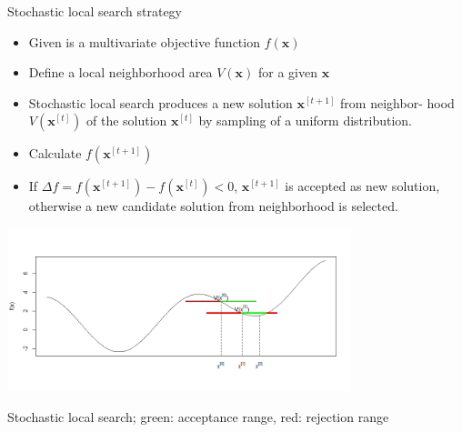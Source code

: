\documentclass[11pt,compress,t,notes=noshow, xcolor=table]{beamer}
\begin{document}
\begin{vbframe}{Stochastic local search strategy}
\vspace{-0.2cm}
\begin{small}
\begin{itemize}
\item Given is a multivariate objective function $f(\bm{x})$
\item Define a local neighborhood area $V(\bm{x})$ for a given $\bm{x}$
\item Stochastic local search produces a new solution $\bm{x}^{[t+1]}$ from neighbor- hood $V(\bm{x}^{[t]})$ of the solution $\bm{x}^{[t]}$ by sampling of a uniform distribution. 
\item Calculate $f(\bm{x}^{[t+1]})$
\item If $\Delta f = f(\bm{x}^{[t+1]}) - f(\bm{x}^{[t]}) < 0$, $\bm{x}^{[t+1]}$ is accepted as new solution, otherwise a new candidate solution from neighborhood is selected.
\end{itemize}
\end{small}
\vspace{-0.5cm}
\begin{center}
\includegraphics[width=0.75\textwidth]{figure_man/local-search.png}
\end{center}
\vspace{-0.5cm}



\footnotesize{Stochastic local search; green: acceptance range, red: rejection range}
\end{vbframe}
\end{document}
